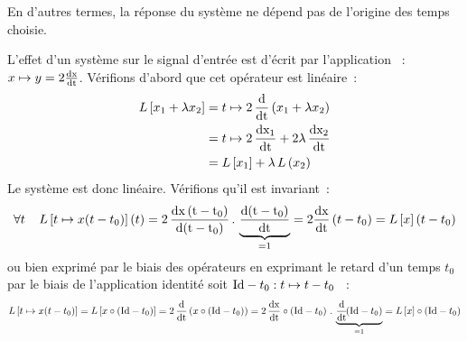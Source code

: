 	En d'autres termes, la réponse du système ne dépend pas de
        l'origine des temps choisie.
        
	\begin{exemple}
          L'effet d'un système sur le signal d'entrée est d'écrit par
          l'application ~: $x \mapsto y=2\frac{\mathrm{d{x}}}{\mathrm{d{t}}}$.  Vérifions
          d'abord que cet opérateur est linéaire~:
          \begin{eqnarray*}
            L\left[x_1+\lambda x_2\right] &= t \mapsto 2\, \frac{\mathrm{d{}}}{\mathrm{d{t}}}\left(x_1+\lambda x_2\right)\\
                                 &= t \mapsto 2\,\frac{\mathrm{d{x_{1}}}}{\mathrm{d{t}}} + 2\lambda\,\frac{\mathrm{d{x_{2}}}}{\mathrm{d{t}}}\\
                                 &= L\left[x_{1}\right]+\lambda\,L\left(x_{2}\right)
          \end{eqnarray*}
          Le système est donc linéaire. Vérifions qu'il est
          invariant~:
          \begin{equation*}
            \forall t \;\;\;\; L\left[t\mapsto x(t-t_{0})\right](t) =2\,\frac{\mathrm{d{x\left(t-t_0\right)}}}{\mathrm{d{\left(t-t_0\right)}}}\,.\,\underbrace{\frac{\mathrm{d{\left(t-t_0\right)}}}{\mathrm{d{t}}}}_{=1}=2\frac{\mathrm{d{x}}}{\mathrm{d{t}}}\left(t-t_0\right)=L\left[x\right]\left(t-t_0\right)
          \end{equation*}
          ou bien exprimé par le biais des opérateurs en exprimant le
          retard d'un temps $t_0$ par le biais de l'application
          identité soit $\mathrm{Id}-t_0 : t \mapsto t - t_0$ ~:
          \begin{equation*}
            L\left[t\mapsto x(t-t_{0})\right] = L\left[x \circ \left(\mathrm{Id}-t_0\right)\right]=2\,\frac{\mathrm{d{}}}{\mathrm{d{t}}}\left(x\circ\left(\mathrm{Id} -t_{0}\right)\right)=2\,\frac{\mathrm{d{x}}}{\mathrm{d{t}}}\circ\left(\mathrm{Id}-t_0\right)\,.\,\underbrace{\frac{\mathrm{d{}}}{\mathrm{d{t}}}\!\!\left(\mathrm{Id}-t_0\right)}_{=1}=L\left[x\right]\circ\left(\mathrm{Id}-t_0\right)
          \end{equation*}
        \end{exemple}
	
      
